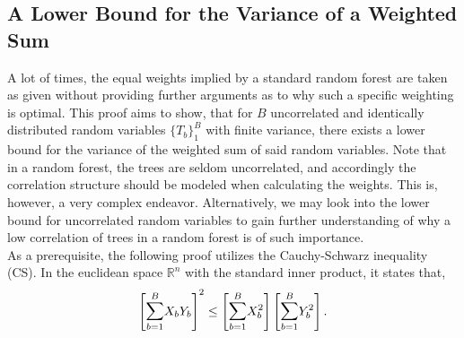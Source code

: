 \documentclass[a4paper,12pt, headsepline]{scrartcl}
\numberwithin{equation}{section}
\begin{document}
 \subsection{A Lower Bound for the Variance of a Weighted Sum}\label{App:A5}
 A lot of times, the equal weights implied by a standard random forest are taken as given without providing further arguments as to why such a specific weighting is optimal. This proof aims to show, that for $B$ uncorrelated and identically distributed random variables $\{T_b\}_1^B$ with finite variance, there exists a lower bound for the variance of the weighted sum of said random variables. Note that in a random forest, the trees are seldom uncorrelated, and accordingly the correlation structure should be modeled when calculating the weights. This is, however, a very complex endeavor. Alternatively, we may look into the lower bound for uncorrelated random variables to gain further understanding of why a low correlation of trees in a random forest is of such importance.\\ As a prerequisite, the following proof utilizes the Cauchy-Schwarz inequality (CS). In the euclidean space $\mathbb{R}^n$ with the standard inner product, it states that,
 \[
 \left[\mathlarger{\sum}\limits_{b = 1}^B X_bY_b \right]^2 \leq \left[\mathlarger{\sum}\limits_{b = 1}^B X_b^2\right] \left[\mathlarger{\sum}\limits_{b = 1}^B Y_b^2\right].
 \]
\end{document}
